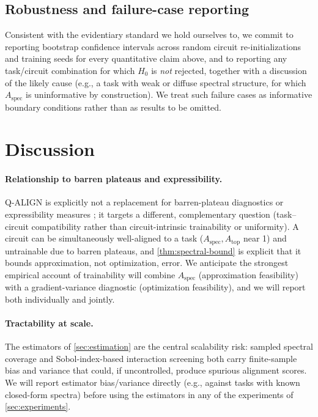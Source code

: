 \documentclass[11pt]{article}
\newcommand{\Aspec}{A_{\mathrm{spec}}}
\newcommand{\Atop}{A_{\mathrm{top}}}
\begin{document}
\subsection{Robustness and failure-case reporting}
Consistent with the evidentiary standard we hold ourselves to, we commit to reporting bootstrap confidence intervals across random circuit re-initializations and training seeds for every quantitative claim above, and to reporting any task/circuit combination for which $H_0$ is \emph{not} rejected, together with a discussion of the likely cause (e.g., a task with weak or diffuse spectral structure, for which $\Aspec$ is uninformative by construction). We treat such failure cases as informative boundary conditions rather than as results to be omitted.

\section{Discussion}
\label{sec:discussion}

\paragraph{Relationship to barren plateaus and expressibility.} Q-ALIGN is explicitly not a replacement for barren-plateau diagnostics \citep{mcclean2018barren,larocca2024review} or expressibility measures \citep{sim2019expressibility}; it targets a different, complementary question (task--circuit compatibility rather than circuit-intrinsic trainability or uniformity). A circuit can be simultaneously well-aligned to a task ($\Aspec, \Atop$ near 1) and untrainable due to barren plateaus, and \cref{thm:spectral-bound} is explicit that it bounds approximation, not optimization, error. We anticipate the strongest empirical account of trainability will combine $\Aspec$ (approximation feasibility) with a gradient-variance diagnostic (optimization feasibility), and we will report both individually and jointly.

\paragraph{Tractability at scale.} The estimators of \cref{sec:estimation} are the central scalability risk: sampled spectral coverage and Sobol-index-based interaction screening both carry finite-sample bias and variance that could, if uncontrolled, produce spurious alignment scores. We will report estimator bias/variance directly (e.g., against tasks with known closed-form spectra) before using the estimators in any of the experiments of \cref{sec:experiments}.
\end{document}
